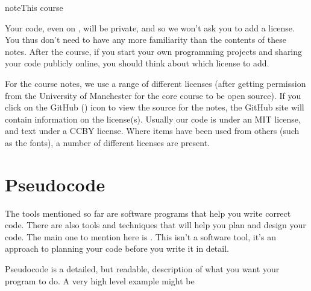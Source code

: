 \documentclass[letterpaper,10pt,british]{sphinxmanual}
\let\sphinxpxdimen\pdfpxdimen\else\newdimen\sphinxpxdimen
\begin{document}
\begin{sphinxadmonition}{note}{This course}

\sphinxAtStartPar
Your code, even on , will be private, and so we won’t ask you to add a license. You thus don’t need to have any more familiarity than the contents of these notes. After the course, if you start your own programming projects and sharing your code publicly online, you should think about which license to add.

\sphinxAtStartPar
For the course notes, we use a range of different licenses (after getting permission from the University of Manchester for the core course to be open source). If you click on the GitHub (\sphinxincludegraphics[width=20\sphinxpxdimen]{{GitHub_Invertocat_Dark1}.svg}) icon to view the source for the notes, the GitHub site will contain information on the license(s). Usually our code is under an MIT license, and text under a CC\sphinxhyphen{}BY license. Where items have been used from others (such as the fonts), a number of different licenses are present.
\end{sphinxadmonition}

\sphinxstepscope


\section{Pseudocode}
\label{\detokenize{chapters/software_development_tools/pseudocode:pseudocode}}\label{\detokenize{chapters/software_development_tools/pseudocode:id1}}\label{\detokenize{chapters/software_development_tools/pseudocode::doc}}
\sphinxAtStartPar
The tools mentioned so far are software programs that help you write correct code. There are also tools and techniques that will help you plan and design your code. The main one to mention here is . This isn’t a software tool, it’s an approach to planning your code before you write it in detail.

\sphinxAtStartPar
Pseudocode is a detailed, but readable, description of what you want your program to do. A very high level example might be

\begin{sphinxVerbatim}[commandchars=\\\{\}]
\end{sphinxVerbatim}
\end{document}
